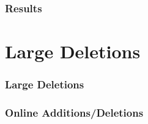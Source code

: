 \documentclass[pdf]{beamer}
\begin{document}
\begin{frame}
  \frametitle{Results}
  
\end{frame}



\appendix
\section{Large Deletions}
\begin{frame}
  \frametitle{Large Deletions}


\end{frame}

\begin{frame}
  \frametitle{Online Additions/Deletions}
  

\end{frame}
\end{document}
